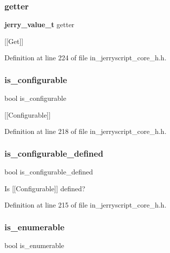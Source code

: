 \subsubsection{getter}
{\footnotesize\ttfamily \textbf{ jerry\+\_\+value\+\_\+t} getter}

[[Get]] 

Definition at line 224 of file in\+\_\+jerryscript\+\_\+core\+\_\+h.\+h.

\mbox{\label{structjerry__property__descriptor__t_a93546175d6c85fe1a3dd8f7bcbf017ed}} 
\subsubsection{is\_configurable}
{\footnotesize\ttfamily bool is\+\_\+configurable}

[[Configurable]] 

Definition at line 218 of file in\+\_\+jerryscript\+\_\+core\+\_\+h.\+h.

\mbox{\label{structjerry__property__descriptor__t_ad809e60b4aecdc12e0d205574bfbf9d7}} 
\subsubsection{is\_configurable\_defined}
{\footnotesize\ttfamily bool is\+\_\+configurable\+\_\+defined}

Is [[Configurable]] defined? 

Definition at line 215 of file in\+\_\+jerryscript\+\_\+core\+\_\+h.\+h.

\mbox{\label{structjerry__property__descriptor__t_a7068da5dff41385027473ebd7170b3a0}} 
\subsubsection{is\_enumerable}
{\footnotesize\ttfamily bool is\+\_\+enumerable}

